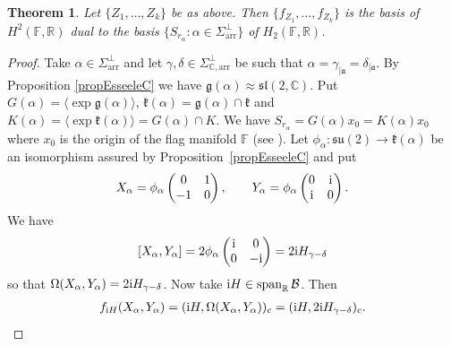 \documentclass[10pt,a4paper]{amsart}
\numberwithin{equation}{section}
\newtheorem{Theorem}{Theorem}[section]
\begin{document}
\begin{Theorem}\label{teo.baseZ} Let $\{Z_{1},\ldots,Z_{k}\}$ be as above. Then $\{f_{Z_{1}},\ldots, f_{Z_{k}}\}$ is the basis of $H^{2}( \mathbb{F},\mathbb{R}) $ dual to the basis $\{S_{r_{\alpha }}\colon \alpha \in \Sigma _{\mathrm{arr}}^{\bot }\}$ of $H_{2}(\mathbb{F},\mathbb{R}) $.
\end{Theorem}



\begin{proof}Take $\alpha \in \Sigma _{\mathrm{arr}}^{\bot }$ and let $\gamma,\delta \in\Sigma _{\mathbb{C},\mathrm{arr}}^{\bot }$ be such that $\alpha =\gamma_{\vert \mathfrak{a} }=\delta _{\vert \mathfrak{a}}$. By Proposition \ref{propEsseeleC} we have $\mathfrak{g}( \alpha) \approx \mathfrak{sl}(2,\mathbb{C}) $. Put $G(\alpha) =\langle \exp \mathfrak{g}(\alpha) \rangle $, $\mathfrak{k}(\alpha) =\mathfrak{g}(\alpha) \cap
\mathfrak{k}$ and $K(\alpha) =\langle \exp \mathfrak{k}(\alpha) \rangle =G(\alpha) \cap K$. We have $S_{r_{\alpha }}=G(\alpha) x_{0}=K(\alpha) x_{0}$ where $x_{0}$ is the origin of the flag manifold $\mathbb{F}$ (see \cite[Proposition 1.3]{RSM}). Let $\phi _{\alpha }\colon \mathfrak{su}(2) \rightarrow \mathfrak{k}(\alpha) $ be an isomorphism assured by Proposition~\ref{propEsseeleC} and put
\begin{gather*}
X_{\alpha }=\phi _{\alpha }\left(
\begin{matrix}
0 & 1 \\
-1 & 0%
\end{matrix}
\right), \qquad Y_{\alpha }=\phi _{\alpha }\left(
\begin{matrix}
0 & {\rm i} \\
{\rm i} & 0
\end{matrix}
\right).
\end{gather*}
We have
\begin{gather*}
\lbrack X_{\alpha },Y_{\alpha }]=2\phi _{\alpha }\left(
\begin{matrix}
{\rm i} & 0 \\
0 & -{\rm i}
\end{matrix}
\right) =2{\rm i}H_{\gamma -\delta }
\end{gather*}
so that $\Omega ( X_{\alpha },Y_{\alpha }) =2{\rm i}H_{\gamma -\delta }$. Now take ${\rm i}H\in \operatorname{span}_{\mathbb{R}}\mathcal{B}$. Then
\begin{gather*}
f_{{\rm i}H}( X_{\alpha },Y_{\alpha }) =( {\rm i}H,\Omega (X_{\alpha },Y_{\alpha })) _{c}=( {\rm i}H,2{\rm i}H_{\gamma -\delta}) _{c}.
\end{gather*}%

\end{proof}
\end{document}
